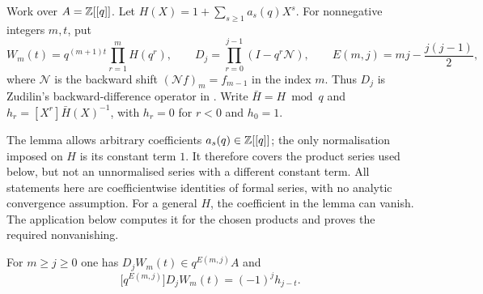 \documentclass[11pt]{article}
\begin{document}
Work over $A=\mathbb{Z}[[q]]$. Let $H(X)=1+\sum_{s\ge1}a_s(q)X^s$.
For nonnegative integers $m,t$, put
\[
 W_m(t)=q^{(m+1)t}\prod_{r=1}^{m}H(q^{r}),
 \qquad
 D_j=\prod_{r=0}^{j-1}(I-q^{r}\mathcal N),
 \qquad
 E(m,j)=mj-\frac{j(j-1)}2,
\]
where $\mathcal N$ is the backward shift $(\mathcal Nf)_m=f_{m-1}$ in the index
$m$. Thus $D_j$ is Zudilin's backward-difference operator in
\cite[Sec.~4, (7), p.~6]{zudilin2016}.  Write $\bar H=H\bmod q$ and
$h_r=[X^{r}]\bar H(X)^{-1}$, with $h_r=0$ for $r<0$ and $h_0=1$.

The lemma allows arbitrary coefficients $a_s(q)\in\mathbb{Z}[[q]]$; the only
normalisation imposed on $H$ is its constant term $1$. It therefore
covers the product series used below, but not an unnormalised series
with a different constant term. All statements here are coefficientwise
identities of formal series, with no analytic convergence assumption.
For a general $H$, the coefficient in the lemma can vanish. The
application below computes it for the chosen products and proves the
required nonvanishing.

\begin{lemma}\label{long1049:res:allrowinitial}
For $m\ge j\ge0$ one has $D_jW_m(t)\in q^{E(m,j)}A$ and
\[
 \bigl[q^{E(m,j)}\bigr]D_jW_m(t)=(-1)^{j}h_{j-t}.
\]
\end{lemma}
\end{document}
